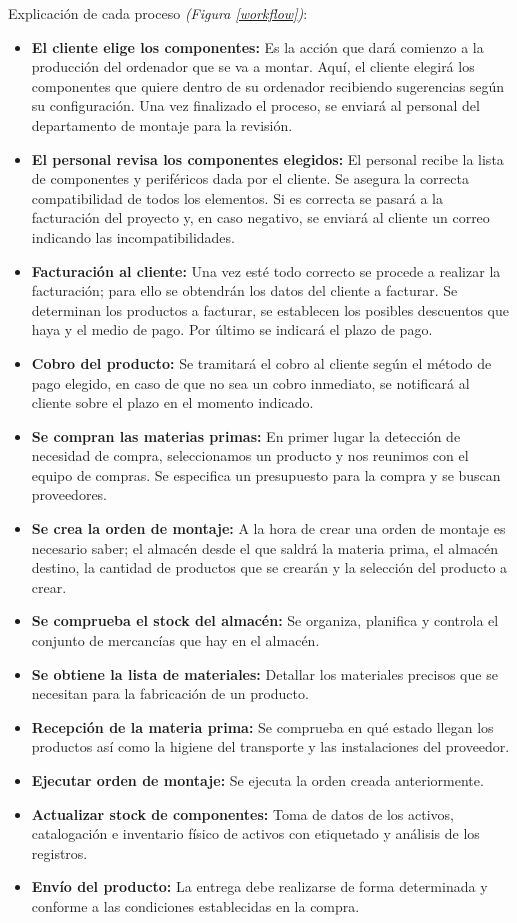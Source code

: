 Explicación de cada proceso \textit{(Figura \ref{workflow})}:
\begin{itemize}
    \item \textbf{El cliente elige los componentes:} Es la acción que dará comienzo a la producción del ordenador que se va a montar. Aquí, el cliente elegirá los componentes que quiere dentro de su ordenador recibiendo sugerencias según su configuración. Una vez finalizado el proceso, se enviará al personal del departamento de montaje para la revisión.
    \item \textbf{El personal revisa los componentes elegidos:} El personal recibe la lista de componentes y periféricos dada por el cliente. Se asegura la correcta compatibilidad de todos los elementos. Si es correcta se pasará a la facturación del proyecto y, en caso negativo, se enviará al cliente un correo indicando las incompatibilidades.
    \item \textbf{Facturación al cliente:} Una vez esté todo correcto se procede a realizar la facturación; para ello se obtendrán los datos del cliente a facturar. Se determinan los productos a facturar, se establecen los posibles descuentos que haya y el medio de pago. Por último se indicará el plazo de pago.
    \item \textbf{Cobro del producto:} Se tramitará el cobro al cliente según el método de pago elegido, en caso de que no sea un cobro inmediato, se notificará al cliente sobre el plazo en el momento indicado.
    \item \textbf{Se compran las materias primas:} En primer lugar la detección de necesidad de compra, seleccionamos un producto y nos reunimos con el equipo de compras. Se especifica un presupuesto para la compra y se buscan proveedores.
    \item \textbf{Se crea la orden de montaje:} A la hora de crear una orden de montaje es necesario saber; el almacén desde el que saldrá la materia prima, el almacén destino, la cantidad de productos que se crearán y la selección del producto a crear.
    \item \textbf{Se comprueba el stock del almacén:} Se organiza, planifica y controla el conjunto de mercancías que hay en el almacén.
    \item \textbf{Se obtiene la lista de materiales:} Detallar los materiales precisos que se necesitan para la fabricación de un producto.
    \item \textbf{Recepción de la materia prima:} Se comprueba en qué estado llegan los productos así como la higiene del transporte y las instalaciones del proveedor.
    \item \textbf{Ejecutar orden de montaje:} Se ejecuta la orden creada anteriormente.
    \item \textbf{Actualizar stock de componentes:} Toma de datos de los activos, catalogación e inventario físico de activos con etiquetado y análisis de los registros.
    \item \textbf{Envío del producto:} La entrega debe realizarse de forma determinada y conforme a las condiciones establecidas en la compra.
\end{itemize}


